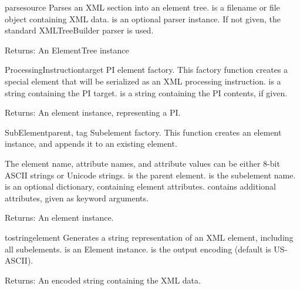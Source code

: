 \begin{funcdesc}{parse}{source}
Parses an XML section into an element tree.
 is a filename or file object containing XML data.
 is an optional parser instance.  If not given, the
standard XMLTreeBuilder parser is used.

\begin{datadescni}{Returns:}
An ElementTree instance
\end{datadescni}
\end{funcdesc}

\begin{funcdesc}{ProcessingInstruction}{target}
PI element factory.  This factory function creates a special element
that will be serialized as an XML processing instruction.
 is a string containing the PI target.
 is a string containing the PI contents, if given.

\begin{datadescni}{Returns:}
An element instance, representing a PI.
\end{datadescni}
\end{funcdesc}

\begin{funcdesc}{SubElement}{parent, tag }
Subelement factory.  This function creates an element instance, and
appends it to an existing element.

The element name, attribute names, and attribute values can be
either 8-bit ASCII strings or Unicode strings.
 is the parent element.
 is the subelement name.
 is an optional dictionary, containing element attributes.
 contains additional attributes, given as keyword arguments.

\begin{datadescni}{Returns:}
An element instance.
\end{datadescni}
\end{funcdesc}

\begin{funcdesc}{tostring}{element}
Generates a string representation of an XML element, including all
subelements.
 is an Element instance.
 is the output encoding (default is US-ASCII).

\begin{datadescni}{Returns:}
An encoded string containing the XML data.
\end{datadescni}
\end{funcdesc}

